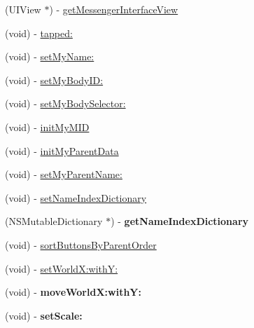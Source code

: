 \begin{DoxyCompactItemize}
\item 
(UIView $\ast$) -\/ \hyperlink{interface_messenger_view_controller_ae7d3fbe4156df4e7f1539f50500f0919}{getMessengerInterfaceView}
\item 
(void) -\/ \hyperlink{interface_messenger_view_controller_a008c7cc6364c75b6f70ef3d79fa3a043}{tapped:}
\item 
(void) -\/ \hyperlink{interface_messenger_view_controller_afe36a73932b47fb2c60412c6f03f67ac}{setMyName:}
\item 
(void) -\/ \hyperlink{interface_messenger_view_controller_abab9347cc7ed46bd04978ca00e081a0e}{setMyBodyID:}
\item 
(void) -\/ \hyperlink{interface_messenger_view_controller_ade8005d21b7d8df69ddd12fba7440f6b}{setMyBodySelector:}
\item 
(void) -\/ \hyperlink{interface_messenger_view_controller_a2c2f7a46b94facbc66d66c7dd6da34bd}{initMyMID}
\item 
(void) -\/ \hyperlink{interface_messenger_view_controller_a5728b61e9c4490af7aacddd874026bae}{initMyParentData}
\item 
(void) -\/ \hyperlink{interface_messenger_view_controller_a9d6939385be720d5335fbf5b095cd63c}{setMyParentName:}
\item 
(void) -\/ \hyperlink{interface_messenger_view_controller_a791916fe5a33b084e90d14cd12d9bc30}{setNameIndexDictionary}
\item 
\hypertarget{interface_messenger_view_controller_a27a84207c430e3402014720823e7b7dd}{
(NSMutableDictionary $\ast$) -\/ {\bfseries getNameIndexDictionary}}
\label{d7/d34/interface_messenger_view_controller_a27a84207c430e3402014720823e7b7dd}

\item 
(void) -\/ \hyperlink{interface_messenger_view_controller_a6c8d083521df8a95e9e88612745d5981}{sortButtonsByParentOrder}
\item 
(void) -\/ \hyperlink{interface_messenger_view_controller_a3939f43ce30df6b8df0390712730282b}{setWorldX:withY:}
\item 
\hypertarget{interface_messenger_view_controller_a48556e3f4bded903ba3080d2411ce5ec}{
(void) -\/ {\bfseries moveWorldX:withY:}}
\label{d7/d34/interface_messenger_view_controller_a48556e3f4bded903ba3080d2411ce5ec}

\item 
\hypertarget{interface_messenger_view_controller_a4f8fb574a6997e9f92731c32a4155c77}{
(void) -\/ {\bfseries setScale:}}
\label{d7/d34/interface_messenger_view_controller_a4f8fb574a6997e9f92731c32a4155c77}


\end{DoxyCompactItemize}

